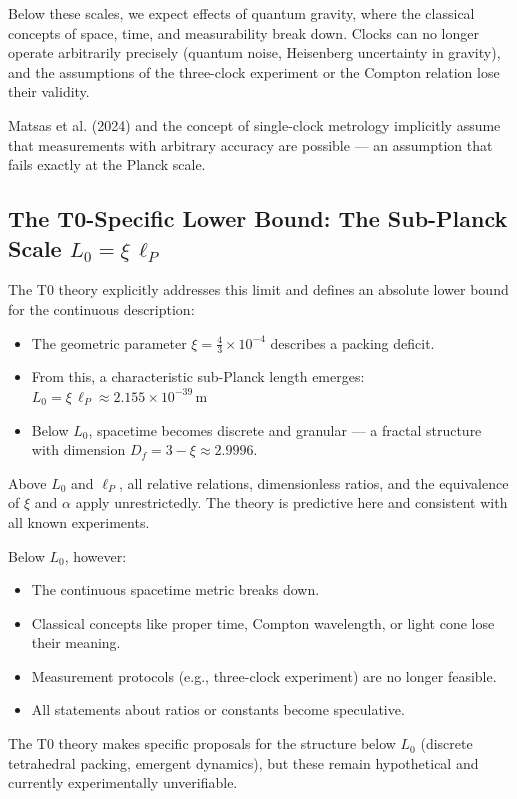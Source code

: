 	Below these scales, we expect effects of quantum gravity, where the classical concepts of space, time, and measurability break down. Clocks can no longer operate arbitrarily precisely (quantum noise, Heisenberg uncertainty in gravity), and the assumptions of the three-clock experiment or the Compton relation lose their validity.
	
	Matsas et al. (2024) and the concept of single-clock metrology implicitly assume that measurements with arbitrary accuracy are possible --- an assumption that fails exactly at the Planck scale.
	
	\subsection{The T0-Specific Lower Bound: The Sub-Planck Scale $L_0 = \xi \, \ell_P$}
	The T0 theory explicitly addresses this limit and defines an absolute lower bound for the continuous description:
	\begin{itemize}
		\item The geometric parameter $\xi = \frac{4}{3} \times 10^{-4}$ describes a packing deficit.
		\item From this, a characteristic sub-Planck length emerges:
		$L_0 = \xi \, \ell_P \approx 2.155 \times 10^{-39}\,\text{m}$
		\item Below $L_0$, spacetime becomes discrete and granular --- a fractal structure with dimension $D_f = 3 - \xi \approx 2.9996$.
	\end{itemize}
	
	Above $L_0$ and $\ell_P$, all relative relations, dimensionless ratios, and the equivalence of $\xi$ and $\alpha$ apply unrestrictedly. The theory is predictive here and consistent with all known experiments.
	
	Below $L_0$, however:
	\begin{itemize}
		\item The continuous spacetime metric breaks down.
		\item Classical concepts like proper time, Compton wavelength, or light cone lose their meaning.
		\item Measurement protocols (e.g., three-clock experiment) are no longer feasible.
		\item All statements about ratios or constants become speculative.
	\end{itemize}
	
	The T0 theory makes specific proposals for the structure below $L_0$ (discrete tetrahedral packing, emergent dynamics), but these remain hypothetical and currently experimentally unverifiable.
	
